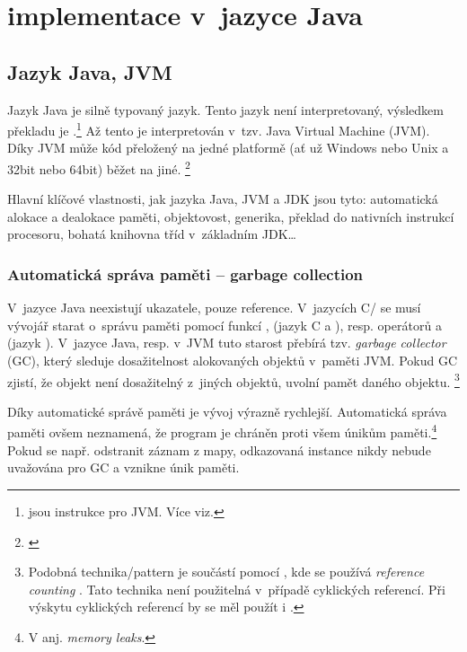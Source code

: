 \chapter{\MIndex{} implementace v~jazyce Java}


\section{Jazyk Java, JVM}

Jazyk Java je silně typovaný jazyk. Tento jazyk není interpretovaný,
výsledkem překladu je \bytecode{}.\footnote{\bytecode{} jsou instrukce pro JVM. Více viz. } Až tento \bytecode{} je interpretován v~tzv. Java Virtual Machine (JVM).
Díky JVM může kód přeložený na jedné platformě (ať už Windows nebo Unix a 32bit nebo 64bit) běžet na jiné. \footnote{\emph{}\cite{lindholm2013java}}

Hlavní klíčové vlastnosti, jak jazyka Java, JVM a JDK
jsou tyto: automatická alokace a dealokace paměti, objektovost, generika,
překlad \bytecode{} do nativních instrukcí procesoru, bohatá
knihovna tříd v~základním JDK\ldots{}

\subsection{Automatická správa paměti -- garbage collection}

V~jazyce Java neexistují ukazatele, pouze reference. V~jazycích C/\CC{}
se musí vývojář starat o~správu paměti pomocí funkcí ,
 (jazyk C a \CC), resp. operátorů  a 
(jazyk \CC). V~jazyce Java, resp. v~JVM \cite{lindholm2013java} tuto starost přebírá tzv. \emph{garbage
collector} (GC), který sleduje
dosažitelnost alokovaných objektů v~paměti JVM. Pokud GC
zjistí, že objekt není dosažitelný z~jiných objektů, uvolní pamět daného objektu.
\footnote{Podobná technika/pattern je součástí  pomocí ,
kde se používá \emph{reference counting} \cite{ISO:2012:CPP}. Tato technika není použitelná v~případě cyklických referencí. Při výskytu cyklických referencí by se měl použít i .
}

Díky automatické správě paměti je vývoj výrazně rychlejší.
Automatická správa paměti ovšem neznamená, že program je chráněn proti všem únikům paměti.\footnote{V anj. \emph{memory leaks}.}
Pokud se např.  odstranit záznam z mapy, odkazovaná instance nikdy nebude uvažována pro GC a vznikne únik paměti.

